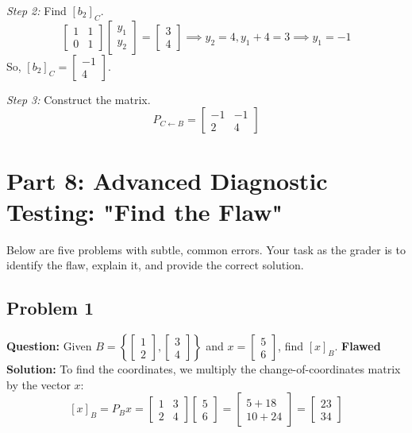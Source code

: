 \documentclass[11pt]{article}
\begin{document}
\textit{Step 2:} Find $[b_2]_C$.
\[ \begin{bmatrix} 1 & 1 \\ 0 & 1 \end{bmatrix} \begin{bmatrix} y_1 \\ y_2 \end{bmatrix} = \begin{bmatrix} 3 \\ 4 \end{bmatrix} \implies y_2 = 4, y_1 + 4 = 3 \implies y_1 = -1 \]
So, $[b_2]_C = \begin{bmatrix} -1 \\ 4 \end{bmatrix}$.

\textit{Step 3:} Construct the matrix.
\[ P_{C \leftarrow B} = \begin{bmatrix} -1 & -1 \\ 2 & 4 \end{bmatrix} \]

\newpage
\section{Part 8: Advanced Diagnostic Testing: "Find the Flaw"}

Below are five problems with subtle, common errors. Your task as the grader is to identify the flaw, explain it, and provide the correct solution.

\subsection{Problem 1}
\textbf{Question:} Given $B = \left\{ \begin{bmatrix} 1 \\ 2 \end{bmatrix}, \begin{bmatrix} 3 \\ 4 \end{bmatrix} \right\}$ and $x = \begin{bmatrix} 5 \\ 6 \end{bmatrix}$, find $[x]_B$.
\textbf{Flawed Solution:} 
To find the coordinates, we multiply the change-of-coordinates matrix by the vector $x$:
\[ [x]_B = P_B x = \begin{bmatrix} 1 & 3 \\ 2 & 4 \end{bmatrix} \begin{bmatrix} 5 \\ 6 \end{bmatrix} = \begin{bmatrix} 5 + 18 \\ 10 + 24 \end{bmatrix} = \begin{bmatrix} 23 \\ 34 \end{bmatrix} \]
\end{document}
